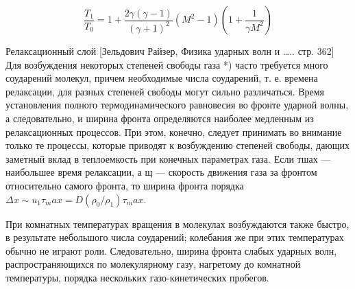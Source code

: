 \documentclass[10pt, a4paper]{article}
\numberwithin{equation}{section}
\begin{document}
\begin{equation}
	\frac{T_1}{T_0}=1+ \frac{2 \gamma (\gamma-1)}{(\gamma+1)^{2}} (M^2-1)(1+\frac{1}{\gamma M^{2}})
\end{equation}


Релаксационный слой [Зельдович Райзер, Физика ударных волн и ….. стр. 362]
Для возбуждения некоторых степеней свободы газа *) часто требуется много соударений молекул, причем необходимые числа соударений, т. е. времена релаксации, для разных степеней свободы могут сильно различаться. 
Время установления полного термодинамического равновесия во фронте ударной волны, а следовательно, и ширина фронта определяются наиболее медленным из релаксационных процессов. При этом, конечно, следует принимать во внимание только те процессы, которые приводят к возбуждению степеней свободы, дающих заметный вклад в теплоемкость 
при конечных параметрах газа. Если тшах — наибольшее время релаксации, а щ — скорость движения газа за фронтом относительно самого фронта, то ширина фронта порядка $\Delta x \sim u_1 \tau_max =D(\rho_0 / \rho_1) \tau_max$.

При комнатных температурах вращения в молекулах возбуждаются также быстро, в результате небольшого числа соударений; колебания же при этих температурах обычно не играют роли. Следовательно, ширина фронта слабых ударных волн, распространяющихся по молекулярному газу, нагретому до комнатной температуры, порядка нескольких газо-кинетических пробегов. 
\end{document}
